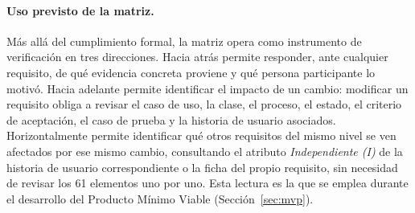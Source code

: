 \documentclass[journal,onecolumn]{IEEEtran}
\begin{document}
\paragraph{Uso previsto de la matriz.}
Más allá del cumplimiento formal, la matriz opera como instrumento de
verificación en tres direcciones. Hacia atrás permite responder, ante
cualquier requisito, de qué evidencia concreta proviene y qué persona
participante lo motivó. Hacia adelante permite identificar el impacto de
un cambio: modificar un requisito obliga a revisar el caso de uso, la
clase, el proceso, el estado, el criterio de aceptación, el caso de prueba
y la historia de usuario asociados. Horizontalmente permite identificar
qué otros requisitos del mismo nivel se ven afectados por ese mismo
cambio, consultando el atributo \emph{Independiente (I)} de la historia de
usuario correspondiente o la ficha del propio requisito, sin necesidad de
revisar los 61 elementos uno por uno. Esta lectura es la que se emplea
durante el desarrollo del Producto Mínimo Viable (Sección~\ref{sec:mvp}).
\end{document}
